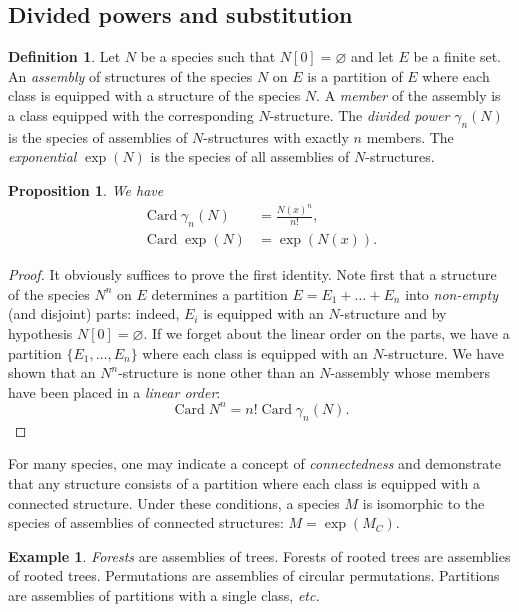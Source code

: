 \documentclass{amsart}
\newtheorem{prop}[thm]{Proposition}
\theoremstyle{definition}
\newtheorem{defn}[thm]{Definition}
\newtheorem{ex}{Example}
\theoremstyle{remark}
\DeclareMathOperator{\Card}{Card}
\newcommand{\term}[1]{\emph{#1}}
\newcommand{\etc}{\textit{etc.}\xspace}
\begin{document}
\subsection{Divided powers and substitution}

\begin{defn}
  Let $N$ be a species such that $N [0] = \varnothing$ and let $E$ be
  a finite set. An \term{assembly} of structures of the species $N$ on
  $E$ is a partition of $E$ where each class is equipped with a
  structure of the species $N$.  A \term{member} of the assembly is a
  class equipped with the corresponding $N$-structure. The
  \term{divided power} $\gamma_n(N)$ is the species of assemblies of
  $N$-structures with exactly $n$ members. The \term{exponential}
  $\exp (N)$ is the species of all assemblies of $N$-structures.
\end{defn}

\begin{prop}
We have
\begin{align*}
\Card \gamma_n(N) &= \frac{N(x)^n}{n!}, \\
\Card \exp (N) &= \exp (N (x)).
\end{align*}
\end{prop}

\begin{proof}
It obviously suffices to prove the first identity.  Note first
that a structure of the species $N^n$ on $E$ determines a partition $E
= E_1 + \dots + E_n$ into \emph{non-empty} (and disjoint) parts:
indeed, $E_i$ is equipped with an $N$-structure and by hypothesis $N
[0] = \varnothing$. If we forget about the linear order on the parts,
we have a partition $\{E_1, \dots, E_n\}$ where each class is equipped
with an $N$-structure. We have shown that an $N^n$-structure is none
other than an $N$-assembly whose members have been placed in a
\emph{linear order}:
\[ \Card N^n = n! \Card \gamma_n(N). \]
\end{proof}

For many species, one may indicate a concept of \term{connectedness}
and demonstrate that any structure consists of a partition
where each class is equipped with a connected structure. Under these conditions, a
species $M$ is isomorphic to the species of assemblies of connected structures:
$M = \exp (M_C)$.

\begin{ex}
  \term{Forests} are assemblies of trees. Forests of rooted trees are
  assemblies of rooted trees. Permutations are assemblies of circular
  permutations. Partitions are assemblies of partitions with a single
  class, \etc
\end{ex}
\end{document}
